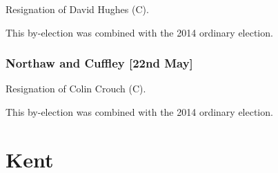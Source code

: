 \documentclass[a4paper,openany]{book}
\begin{document}
\begin{results}

Resignation of David Hughes (C).

This by-election was combined with the 2014 ordinary election.

\subsubsection*{Northaw and Cuffley \hspace*{\fill}\nolinebreak[1]%
\enspace\hspace*{\fill}
[22nd May]}


Resignation of Colin Crouch (C).

This by-election was combined with the 2014 ordinary election.

\end{results}

\section{Kent}
\end{document}
